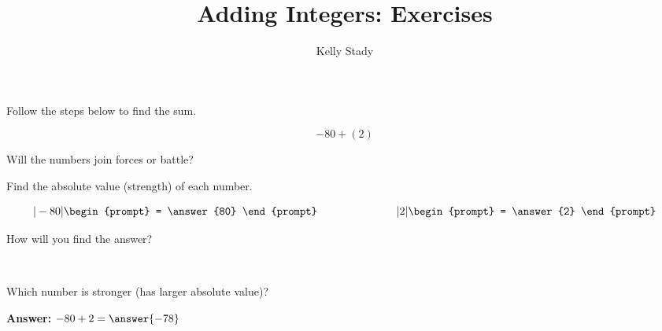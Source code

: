\documentclass{ximera}[font=12pt]
\title{Adding Integers: Exercises}   %
\author{Kelly Stady}
\begin{document}
  


\begin{abstract}

\end{abstract}

\maketitle
\label{xim:AddIntExercises}

\begin{problem}
Follow the steps below to find the sum.

\[ -80 + (2) \]

Will the numbers join forces or battle?

\begin{multipleChoice}
\end{multipleChoice}

\begin{problem}
Find the absolute value (strength) of each number.

\[ |-80| \begin{prompt} = \answer{80} \end{prompt} \hspace{1in} |2| \begin{prompt} = \answer{2} \end{prompt} \]

\begin{problem}
How will you find the answer?

~ \\[0.5em]

\begin{multipleChoice}
\end{multipleChoice}

\begin{problem}
Which number is stronger (has larger absolute value)?

\begin{multipleChoice}
\end{multipleChoice}

\textbf{Answer:}  $-80 + 2 = \answer{-78}$

\end{problem}
\end{problem}
\end{problem}
\end{problem}
\end{document}
